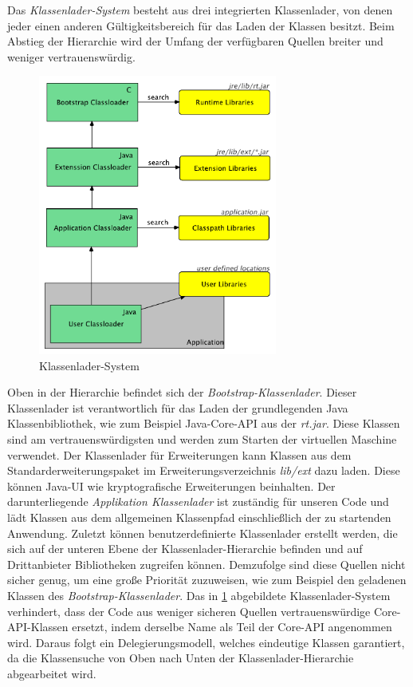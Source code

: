     Das \textit{Klassenlader-System} besteht aus drei integrierten Klassenlader, von denen jeder einen anderen Gültigkeitsbereich für das Laden der Klassen besitzt. Beim Abstieg der Hierarchie wird der Umfang der verfügbaren Quellen breiter und weniger vertrauenswürdig. 

    \begin{figure}[h!]
      \centering
      \includegraphics[width=0.7\textwidth]{material/images/Classloader-Hierarhie2.pdf}
      \caption{Klassenlader-System \cite{classLoadingIntro}}
      \label{fig:cl}
    \end{figure}
    
    Oben in der Hierarchie befindet sich der \textit{Bootstrap-Klassenlader}. Dieser Klassenlader ist verantwortlich für das Laden der grundlegenden Java Klassenbibliothek, wie zum Beispiel Java-Core-API aus der \textit{rt.jar}. Diese Klassen sind am vertrauenswürdigsten und werden zum Starten der virtuellen Maschine verwendet. Der Klassenlader für Erweiterungen kann Klassen  aus dem Standarderweiterungspaket im Erweiterungsverzeichnis \textit{lib/ext} dazu laden. Diese können Java-UI wie kryptografische Erweiterungen beinhalten. Der darunterliegende \textit{Applikation Klassenlader} ist zuständig für unseren Code und lädt Klassen aus dem allgemeinen Klassenpfad einschließlich der zu startenden Anwendung. Zuletzt können benutzerdefinierte Klassenlader erstellt werden, die sich auf der unteren Ebene der Klassenlader-Hierarchie befinden und auf Drittanbieter Bibliotheken zugreifen können. Demzufolge sind diese Quellen nicht sicher genug, um eine große Priorität zuzuweisen, wie zum Beispiel den geladenen Klassen des \textit{Bootstrap-Klassenlader}.\bigbreak 
    Das in \ref{fig:cl} abgebildete Klassenlader-System verhindert, dass der Code aus weniger sicheren Quellen vertrauenswürdige Core-API-Klassen ersetzt, indem derselbe Name als Teil der Core-API angenommen wird. Daraus folgt ein Delegierungsmodell, welches eindeutige Klassen garantiert, da die Klassensuche von Oben nach Unten der Klassenlader-Hierarchie abgearbeitet wird.  \cite{classLoadingIntro} 
    

